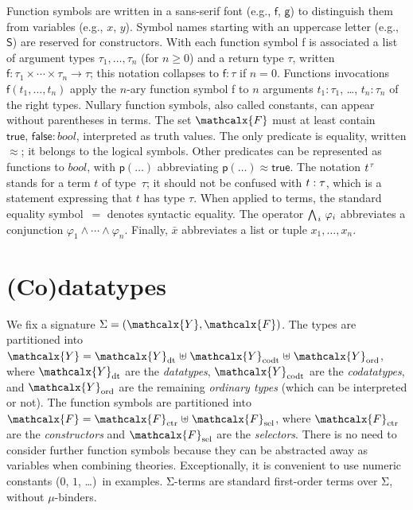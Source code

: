 \documentclass[smallcondensed,draft]{svjour3}
\newcommand\typ[1]{^{\vthinspace #1}}
\newcommand\Sig{\mathrm{\Sigma}}
\newcommand\const[1]{\textsf{#1}}
\newcommand\ty[1]{\textit{#1}}
\newcommand{\teq}{\approx}
\newcommand\Types{\mathcalx{Y}}
\newcommand\Funcs{\mathcalx{F}}
\newcommand\Data{\Types_{\mathrm{dt}}}
\newcommand\Codata{\Types_{\mathrm{codt}}}
\newcommand\Nondata{\Types_{\mathrm{ord}}}
\newcommand\Ctr{\Funcs_{\smash{\mathrm{ctr}}}}
\newcommand\Sel{\Funcs_{\smash{\mathrm{sel}}}}
\newcommand\vthinspace{\kern+0.083333em}
\begin{document}
Function symbols are written in a sans-serif font (e.g., $\const{f}$, $\const{g}$) to
distinguish them from variables (e.g., $x$, $y$).
Symbol names starting with an uppercase letter (e.g.,
$\const{S}$) are reserved for constructors. With each function symbol \const{f}
is associated a list of argument types $\tau_1,\ldots,\tau_n$ (for $n \ge 0$)
and a return type $\tau$, written
$\const{f} : \tau_1 \times \cdots \times \tau_n \to \tau$;
this notation collapses to $\const{f} : \tau$ if $n = 0$.
%
Functions invocations $\const{f}(t_1,\ldots,t_n)$
apply the $n$-ary function symbol
\const{f} to $n$ %
arguments $t_1 \mathbin{:} \tau_1$, \ldots, $t_n \mathbin{:}
\tau_n$ of the right types.
Nullary function symbols, also called constants, can appear without
parentheses in terms.
The set $\Funcs$ must at least contain
$\const{true},\, \const{false} : \ty{bool}$, interpreted as truth values.
The only predicate is equality, written $\teq$;
it belongs to the logical symbols.
Other predicates can be represented as functions to $\ty{bool}$,
with $\const{p}(\ldots)$ abbreviating $\const{p}(\ldots) \teq \const{true}$.
The notation $t\typ{\tau}$ stands for a term $t$ of type~$\tau$;
it should not be confused with $t :\nobreak \tau$,
which is a statement expressing that $t$ has type $\tau$.
When applied to terms, the standard equality symbol~$=$ denotes syntactic equality.
The operator $\bigwedge_{\vthinspace i}\, \varphi_i$ abbreviates a conjunction
$\varphi_1 \mathrel\land \cdots \mathrel\land \varphi_n$.
Finally, $\bar x$ abbreviates a list or tuple $x_1,\ldots,x_n$.


\section{%
(Co)datatypes}
\label{sec:co-datatypes}


We fix a signature $\Sig = (\Types, \Funcs)$. The types are partitioned into
$\Types = \Data \mathrel{\uplus} \Codata \mathrel{\uplus} \Nondata$, where $\Data$ are the
\emph{datatypes}, $\Codata$ are the \emph{codatatypes}, and $\Nondata$ are the remaining
\emph{ordinary types} (which can be interpreted or not). The function symbols are
partitioned into $\Funcs = \Ctr \mathrel{\uplus} \Sel$, where $\Ctr$ are the
\emph{constructors} and $\Sel$ are the \emph{selectors}. There is no need to
consider further function symbols because they can be abstracted away as
variables when combining theories.
Exceptionally, it is convenient to use numeric constants ($0$, $1$, \ldots)\ in
examples.
$\Sig$-terms are standard first-order terms
over $\Sig$,
without $\mu$-binders.
\end{document}
